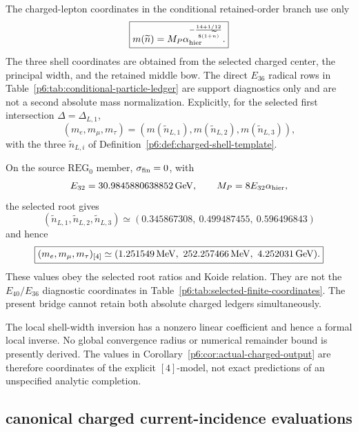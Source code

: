 \documentclass[12pt,a4paper]{article}
\begin{document}
\begin{definition}
\label{p6:def:charged-absolute-map}
The charged-lepton coordinates in the conditional retained-order branch use
only
\[
\boxed{
m(\widetilde n)
=
M_P\alpha_{\rm hier}^{-\frac{14+1/12}
{8(1+\widetilde n)}}.
}
\]
The three shell coordinates are obtained from the selected charged center,
the principal width, and the retained middle bow.  The direct
\(E_{36}\) radical rows in Table~\ref{p6:tab:conditional-particle-ledger}
are support diagnostics only and are not a second absolute mass
normalization.
Explicitly, for the selected first intersection \(\Delta=\Delta_{L,1}\),
\[
\boxed{
(m_e,m_\mu,m_\tau)
=
\left(
m(\widetilde n_{L,1}),
m(\widetilde n_{L,2}),
m(\widetilde n_{L,3})
\right),
}
\]
with the three \(\widetilde n_{L,i}\) of
Definition~\ref{p6:def:charged-shell-template}.
\end{definition}

\begin{corollary}
\label{p6:cor:actual-charged-output}
On the source \(\mathrm{REG}_0\) member, \(\sigma_{\rm fin}=0\), with
\[
E_{32}=30.9845880638852\,{\rm GeV},
\qquad
M_P=8E_{32}\alpha_{\rm hier},
\]
the selected root gives
\[
(\widetilde n_{L,1},\widetilde n_{L,2},\widetilde n_{L,3})
\simeq
(0.345867308,\ 0.499487455,\ 0.596496843)
\]
and hence
\[
\boxed{
(m_e,m_\mu,m_\tau)_{[4]}
\simeq
(1.251549\,{\rm MeV},\
252.257466\,{\rm MeV},\
4.252031\,{\rm GeV}).
}
\]
These values obey the selected root ratios and Koide relation.  They are not
the \(E_{40}/E_{36}\) diagnostic coordinates in
Table~\ref{p6:tab:selected-finite-coordinates}.  The present bridge cannot
retain both absolute charged ledgers simultaneously.
\end{corollary}

\begin{remark}
The local shell-width inversion has a nonzero linear coefficient and hence a
formal local inverse.  No global convergence radius or numerical remainder
bound is presently derived.  The values in
Corollary~\ref{p6:cor:actual-charged-output} are therefore coordinates of the
explicit \([4]\)-model, not exact predictions of an unspecified analytic
completion.
\end{remark}

\subsection{canonical charged current-incidence evaluations}
\label{p6:sec:v594-charged-current-incidence-closure}
\end{document}
